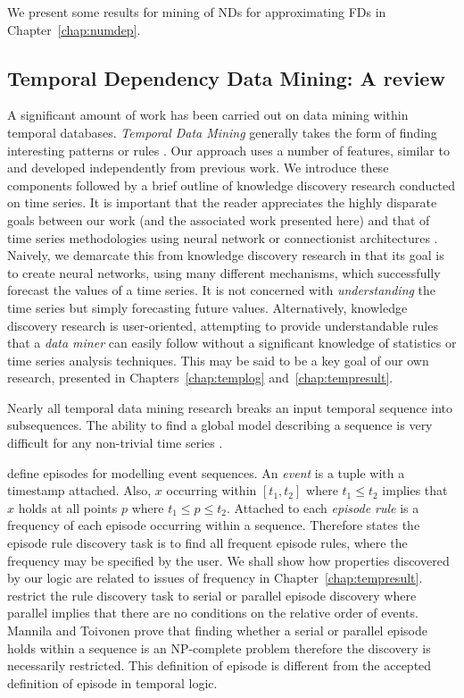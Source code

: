 \medskip
We present some results
for mining of NDs for approximating FDs in Chapter~\ref{chap:numdep}. 


\subsection{Temporal Dependency Data Mining: A review}\label{subsec:temp_mine}

A significant amount of work has been carried out on data mining
within temporal databases. {\em Temporal Data Mining} generally takes
the form of finding interesting patterns \cite{bt98} or rules
\cite{dlm98,mt96}. Our approach uses a number of features, similar to
and developed independently from
previous work. We introduce these components followed by a brief
outline of knowledge discovery research conducted on time series. It
is important that the reader appreciates the highly disparate goals
between our work (and the associated work presented here) and that of
time series methodologies using neural network or connectionist architectures
\cite{wg94,fc95}. Naively, we demarcate this from knowledge discovery
research in that its goal is to create neural networks, using many
different mechanisms, which successfully forecast the values of a time
series. It is not concerned with {\em understanding} the time series
but simply forecasting future values. Alternatively,
knowledge discovery research is user-oriented, attempting to provide
understandable rules that a {\em data miner} can easily follow
without a significant knowledge of statistics or time series analysis
techniques. This may be said to be a key goal of our own research,
presented in Chapters~\ref{chap:templog} and~\ref{chap:tempresult}.

\medskip

Nearly all temporal data mining research breaks an input temporal sequence into
subsequences. The ability to find a global model describing a sequence
is very difficult for any non-trivial time series \cite{end95}.

\medskip
{}
\cite{mtv95,mt96,mt96b} define episodes for modelling event
sequences. An {\em event} is a tuple with a timestamp attached. Also, $x$
occurring within $[ t_1, t_2 ]$ where $t_1 \le t_2$ implies that $x$
holds at all points $p$ where $t_1 \le p \le t_2$. Attached to each
{\em episode rule} is a frequency of each episode occurring
within a sequence. Therefore \cite{mt96} states the episode rule
discovery task is to find all frequent episode rules, where the
frequency may be specified by the user. We shall show how properties
discovered by our logic are related to issues of frequency in
Chapter~\ref{chap:tempresult}. \cite{mt96} restrict the rule
discovery task to serial or parallel episode discovery where parallel
implies that there are no conditions on the relative order of events.
Mannila and Toivonen prove that finding whether a serial or parallel
episode holds within a sequence is an NP-complete problem therefore
the discovery is necessarily restricted. This definition of episode is
different from the accepted definition of episode in temporal logic.

